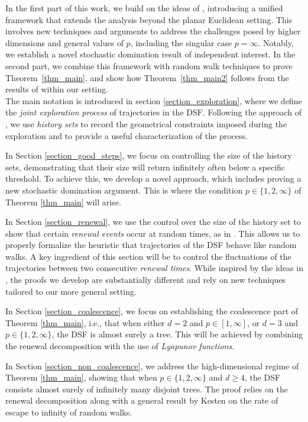 \documentclass[a4paper, 11pt]{article}
\theoremstyle{plain}
\theoremstyle{definition}
\numberwithin{equation}{section}
\begin{document}
In the first part of this work, we build on the ideas of \cite{Dsf2d}, introducing a unified framework that extends the analysis beyond the planar Euclidean setting. This involves new techniques and arguments to address the challenges posed by higher dimensions and general values of $p$, including the singular case $p=\infty$. Notably, we establish a novel stochastic domination result of independent interest. In the second part, we combine this framework with random walk techniques to prove Theorem~\ref{thm_main}, and show how Theorem~\ref{thm_main2} follows from the results of \cite{Dsf2d} within our setting.\\

The main notation is introduced in section \ref{section_exploration}, where we define the \emph{joint exploration process} of trajectories in the DSF. Following the approach of \cite{Dsf2d}, we use \emph{history sets} to record the geometrical constraints imposed during the exploration and to provide a useful characterization of the process. 

In Section \ref{section_good_steps}, we focus on controlling the size of the history sets, demonstrating that their size will return infinitely often below a specific threshold. To achieve this, we develop a novel approach, which includes proving a new stochastic domination argument. This is where the condition $p\in\{1, 2, \infty\}$ of Theorem \ref{thm_main} will arise.

In Section \ref{section_renewal}, we use the control over the size of the history set to show that certain \emph{renewal events} occur at random times, as in \cite{Dsf2d}. This allows us to properly formalize the heuristic that trajectories of the DSF behave like random walks. A key ingredient of this section will be to control the fluctuations of the trajectories between two consecutive \emph{renewal times}. While inspired by the ideas in \cite{Dsf2d}, the proofs we develop are substantially different and rely on new techniques tailored to our more general setting.

In Section \ref{section_coalescence}, we focus on establishing the coalescence part of Theorem \ref{thm_main}, i.e., that when either $d=2$ and $p\in[1, \infty]$, or $d=3$ and $p\in\{1, 2, \infty\}$, the DSF is almost surely a tree. This will be achieved by combining the renewal decomposition with the use of \emph{Lyapunov functions}.

In Section \ref{section_non_coalescence}, we address the high-dimensional regime of Theorem \ref{thm_main}, showing that when $p\in\{1, 2, \infty\}$ and $d\geq 4$, the DSF consists almost surely of infinitely many disjoint trees. The proof relies on the renewal decomposition along with a general result by Kesten \cite{KestenErickson} on the rate of escape to infinity of random walks.
\end{document}
